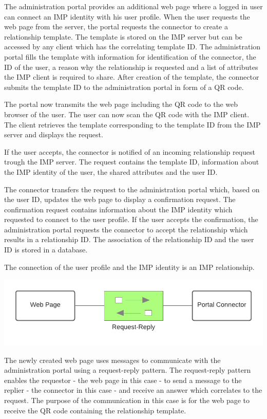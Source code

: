 \documentclass[
     12pt,         %
     a4paper,      %
     BCOR=10mm,version=first,     %
     DIV=14,version=first,        %
     ]{scrreprt}
\begin{document}
The administration portal provides an additional web page where a logged in user can connect an IMP identity with his user profile. When the user requests the web page from the server, the portal requests the connector to create a relationship template. The template is stored on the IMP server but can be accessed by any client which has the correlating template ID. The administration portal fills the template with information for identification of the connector, the ID of the user, a reason why the relationship is requested and a list of attributes the IMP client is required to share. After creation of the template, the connector submits the template ID to the administration portal in form of a QR code.

The portal now transmits the web page including the QR code to the web browser of the user. The user can now scan the QR code with the IMP client. The client retrieves the template corresponding to the template ID from the IMP server and displays the request.

If the user accepts, the connector is notified of an incoming relationship request trough the IMP server. The request contains the template ID, information about the IMP identity of the user, the shared attributes and the user ID.

The connector transfers the request to the administration portal which, based on the user ID, updates the web page to display a confirmation request. The confirmation request contains information about the IMP identity which requested to connect to the user profile. If the user accepts the confirmation, the administration portal requests the connector to accept the relationship which results in a relationship ID. The association of the relationship ID and the user ID is stored in a database.

The connection of the user profile and the IMP identity is an IMP relationship.

\begin{center}
    \includegraphics[width=15cm]{Diagrams/Integration 1/Connection/Messaging Overview.png}
\end{center}

The newly created web page uses messages to communicate with the administration portal using a request-reply pattern. The request-reply pattern enables the requestor - the web page in this case - to send a message to the replier - the connector in this case - and receive an answer which correlates to the request. The purpose of the communication in this case is for the web page to receive the QR code containing the relationship template.
\end{document}
